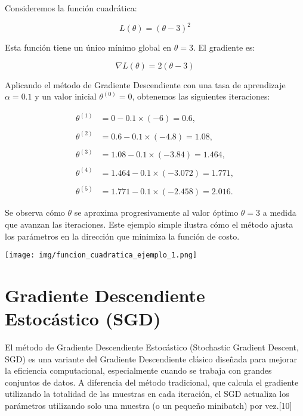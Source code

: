 \documentclass[12pt, letterpaper,conference]{IEEEtran}
\begin{document}
Consideremos la función cuadrática:

\[
L(\theta) = (\theta - 3)^2
\]

Esta función tiene un único mínimo global en \( \theta = 3 \). El gradiente es:

\[
\nabla L(\theta) = 2(\theta - 3)
\]

Aplicando el método de Gradiente Descendiente con una tasa de aprendizaje \( \alpha = 0.1 \) y un valor inicial \( \theta^{(0)} = 0 \), obtenemos las siguientes iteraciones:

\begin{align*}
\theta^{(1)} &= 0 - 0.1 \times (-6) = 0.6, \\\\
\theta^{(2)} &= 0.6 - 0.1 \times (-4.8) = 1.08, \\\\
\theta^{(3)} &= 1.08 - 0.1 \times (-3.84) = 1.464, \\\\
\theta^{(4)} &= 1.464 - 0.1 \times (-3.072) = 1.771, \\\\
\theta^{(5)} &= 1.771 - 0.1 \times (-2.458) = 2.016.
\end{align*}

Se observa cómo \( \theta \) se aproxima progresivamente al valor óptimo \( \theta = 3 \) a medida que avanzan las iteraciones. Este ejemplo simple ilustra cómo el método ajusta los parámetros en la dirección que minimiza la función de costo.


\vspace{0.3cm}

\texttt{[image: img/funcion\_cuadratica\_ejemplo\_1.png]}




\vspace{0.25cm}

\section{Gradiente Descendiente Estocástico (SGD)}

El método de Gradiente Descendiente Estocástico (Stochastic Gradient Descent, SGD) es una variante del Gradiente Descendiente clásico diseñada para mejorar la eficiencia computacional, especialmente cuando se trabaja con grandes conjuntos de datos. A diferencia del método tradicional, que calcula el gradiente utilizando la totalidad de las muestras en cada iteración, el SGD actualiza los parámetros utilizando solo una muestra (o un pequeño minibatch) por vez.[10]
\end{document}
